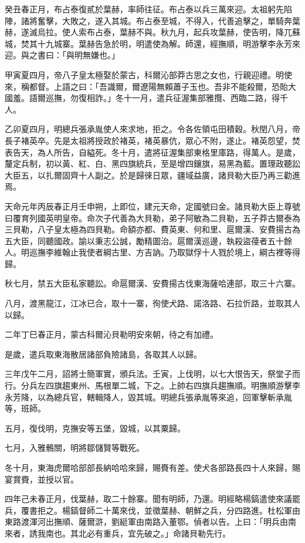 \begin{pinyinscope}
癸丑春正月，布占泰復貳於葉赫，率師往征。布占泰以兵三萬來迎。太祖躬先陷陣，諸將奮擊，大敗之，遂入其城。布占泰至城，不得入，代善追擊之，單騎奔葉赫，遂滅烏拉。使人索布占泰，葉赫不與。秋九月，起兵攻葉赫，使告明，降兀蘇城，焚其十九城寨。葉赫告急於明，明遣使為解。師還，經撫順，明游擊李永芳來迎。與之書曰：「與明無嫌也。」

甲寅夏四月，帝八子皇太極娶於蒙古，科爾沁部莽古思之女也，行親迎禮。明使來，稱都督。上語之曰：「吾識爾，爾遼陽無賴蕭子玉也。吾非不能殺爾，恐貽大國羞。語爾巡撫，勿復相詐。」冬十一月，遣兵征渥集部雅攬、西臨二路，得千人。

乙卯夏四月，明總兵張承胤使人來求地，拒之。令各佐領屯田積穀。秋閏八月，帝長子褚英卒。先是太祖將授政於褚英，褚英暴伉，眾心不附，遂止。褚英怨望，焚表告天，為人所告，自縊死。冬十月，遣將征渥集部東格里庫路，得萬人。是歲，釐定兵制，初以黃、紅、白、黑四旗統兵，至是增四鑲旗，易黑為藍。置理政聽訟大臣五，以扎爾固齊十人副之。於是歸徠日眾，疆域益廣，諸貝勒大臣乃再三勸進焉。

天命元年丙辰春正月壬申朔，上即位，建元天命，定國號曰金。諸貝勒大臣上尊號曰覆育列國英明皇帝。命次子代善為大貝勒，弟子阿敏為二貝勒，五子莽古爾泰為三貝勒，八子皇太極為四貝勒。命額亦都、費英東、何和里、扈爾漢、安費揚古為五大臣，同聽國政。諭以秉志公誠，勵精圖治。扈爾漢巡邊，執殺盜葠者五十餘人。明巡撫李維翰止我使者綱古里、方吉訥。乃取獄俘十人戮於境上，綱古裡等得歸。

秋七月，禁五大臣私家聽訟。命扈爾漢、安費揚古伐東海薩哈連部，取三十六寨。

八月，渡黑龍江，江冰已合，取十一寨，徇使犬路、諾洛路、石拉忻路，並取其人以歸。

二年丁巳春正月，蒙古科爾沁貝勒明安來朝，待之有加禮。

是歲，遣兵取東海散居諸部負險諸島，各取其人以歸。

三年戊午二月，詔將士簡軍實，頒兵法。壬寅，上伐明，以七大恨告天，祭堂子而行。分兵左四旗趨東州、馬根單二城，下之。上帥右四旗兵趨撫順。明撫順游擊李永芳降，以為總兵官，轄輯降人，毀其城。明總兵張承胤等來追，回軍擊斬承胤等，班師。

五月，復伐明，克撫安等五堡，毀城，以其粟歸。

七月，入雅鶻關，明將鄒儲賢等戰死。

冬十月，東海虎爾哈部部長納哈哈來歸，賜賚有差。使犬各部路長四十人來歸，賜宴賞賚，並授以官。

四年己未春正月，伐葉赫，取二十餘寨。聞有明師，乃還。明經略楊鎬遣使來議罷兵，覆書拒之。楊鎬督師二十萬來伐，並徵葉赫、朝鮮之兵，分四路進。杜松軍由東路渡渾河出撫順、薩爾滸，劉綎軍由南路入董鄂。偵者以告。上曰：「明兵由南來者，誘我南也。其北必有重兵，宜先破之。」命諸貝勒先行。


\end{pinyinscope}
